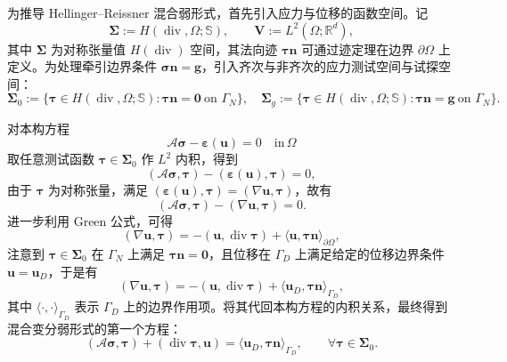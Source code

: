 为推导 Hellinger–Reissner 混合弱形式，首先引入应力与位移的函数空间。记
\[
\boldsymbol{\Sigma} := {H}(\operatorname{div},\Omega;\mathbb{S}),\qquad\boldsymbol{V} := L^2(\Omega;\mathbb{R}^d),
\]
其中 $\boldsymbol{\Sigma}$ 为对称张量值 $H(\operatorname{div})$ 空间，其法向迹 $\boldsymbol{\tau}\boldsymbol{n}$ 可通过迹定理在边界 $\partial\Omega$ 上定义。为处理牵引边界条件 $\boldsymbol{\sigma}\boldsymbol{n}=\boldsymbol{g}$，引入齐次与非齐次的应力测试空间与试探空间：
\[
\boldsymbol{\Sigma}_0 :=\big\{\boldsymbol{\tau}\in{H}(\operatorname{div},\Omega;\mathbb{S}) : \boldsymbol{\tau}\boldsymbol{n}=\boldsymbol{0}\ \text{on }\Gamma_N\big\}, \quad \boldsymbol{\Sigma}_g :=\big\{\boldsymbol{\tau}\in{H}(\operatorname{div},\Omega;\mathbb{S}): \boldsymbol{\tau}\boldsymbol{n}=\boldsymbol{g}\ \text{on }\Gamma_N\big\}.
\]

对本构方程
\[
\mathcal{A}\boldsymbol{\sigma} - \boldsymbol{\varepsilon}(\boldsymbol{u}) = 0\quad\text{in}\,\Omega
\]
取任意测试函数 $\boldsymbol{\tau}\in\boldsymbol{\Sigma}_0$ 作 $L^2$ 内积，得到
\[
(\mathcal{A}\boldsymbol{\sigma},\boldsymbol{\tau}) - (\boldsymbol{\varepsilon}(\boldsymbol{u}),\boldsymbol{\tau}) = 0,
\]
由于 $\boldsymbol{\tau}$ 为对称张量，满足 $(\boldsymbol{\varepsilon}(\boldsymbol{u}),\boldsymbol{\tau}) = (\nabla\boldsymbol{u},\boldsymbol{\tau})$，故有
\[
(\mathcal{A}\boldsymbol{\sigma},\boldsymbol{\tau}) - (\nabla\boldsymbol{u},\boldsymbol{\tau}) = 0.
\]
进一步利用 Green 公式，可得
\[
(\nabla\boldsymbol{u},\boldsymbol{\tau}) = -(\boldsymbol{u},\operatorname{div}\boldsymbol{\tau}) + \langle\boldsymbol{u},\boldsymbol{\tau}\boldsymbol{n}\rangle_{\partial\Omega},
\]
注意到 $\boldsymbol{\tau}\in\boldsymbol{\Sigma}_{0}$ 在 $\Gamma_{N}$ 上满足 $\boldsymbol{\tau}\boldsymbol{n} = \boldsymbol{0}$，且位移在 $\Gamma_D$ 上满足给定的位移边界条件 $\boldsymbol{u} = \boldsymbol{u}_{D}$，于是有
\[
(\nabla\boldsymbol{u},\boldsymbol{\tau}) =-(\boldsymbol{u},\operatorname{div}\boldsymbol{\tau}) +\langle\boldsymbol{u}_D,\boldsymbol{\tau}\boldsymbol{n}\rangle_{\Gamma_D},
\]
其中 $\langle\cdot,\cdot\rangle_{\Gamma_D}$ 表示 $\Gamma_D$ 上的边界作用项。将其代回本构方程的内积关系，最终得到混合变分弱形式的第一个方程：
\begin{equation}
	(\mathcal{A}\boldsymbol{\sigma},\boldsymbol{\tau}) + (\operatorname{div}\boldsymbol{\tau}, \boldsymbol{u}) = \langle\boldsymbol{u}_D,\boldsymbol{\tau}\boldsymbol{n}\rangle_{\Gamma_D},\qquad\forall\boldsymbol{\tau}\in\boldsymbol{\Sigma}_0.
	\label{eq:ch5_weak_form_part1}
\end{equation}

